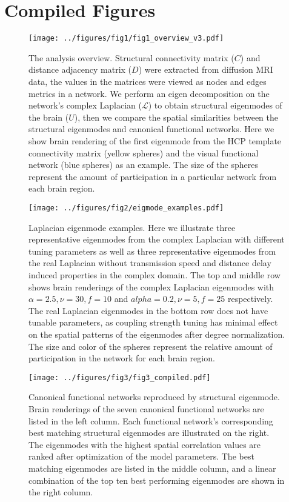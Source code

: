 \documentclass{article}
\begin{document}
\section{Compiled Figures}

\begin{figure}[ht]
  \centering
  \texttt{[image: ../figures/fig1/fig1\_overview\_v3.pdf]}
  \caption{The analysis overview. Structural connectivity matrix ($C$) and distance adjacency matrix ($D$) were extracted from diffusion MRI data, the values in the matrices were viewed as nodes and edges metrics in a network. We perform an eigen decomposition on the network's complex Laplacian ($\mathcal{L}$) to obtain structural eigenmodes of the brain ($U$), then we compare the spatial similarities between the structural eigenmodes and canonical functional networks. Here we show brain rendering of the first eigenmode from the HCP template connectivity matrix (yellow spheres) and the visual functional network (blue spheres) as an example. The size of the spheres represent the amount of participation in a particular network from each brain region.}
  \label{fig:fig1}
\end{figure}

\begin{figure}[ht]
 \centering
 \texttt{[image: ../figures/fig2/eigmode\_examples.pdf]}
 \caption{Laplacian eigenmode examples. Here we illustrate three representative eigenmodes from the complex Laplacian with different tuning parameters as well as three representative eigenmodes from the real Laplacian without transmission speed and distance delay induced properties in the complex domain. The top and middle row shows brain renderings of the complex Laplacian eigenmodes with {$\alpha = 2.5, \nu = 30, f = 10$} and {$alpha = 0.2, \nu = 5, f = 25$} respectively. The real Laplacian eigenmodes in the bottom row does not have tunable parameters, as coupling strength tuning has minimal effect on the spatial patterns of the eigenmodes after degree normalization. The size and color of the spheres represent the relative amount of participation in the network for each brain region.}
 \label{fig:fig2}
\end{figure}

\begin{figure}[ht]
 \centering
 \texttt{[image: ../figures/fig3/fig3\_compiled.pdf]}
 \caption{Canonical functional networks reproduced by structural eigenmode. Brain renderings of the seven canonical functional networks are listed in the left column. Each functional network's corresponding best matching structural eigenmodes are illustrated on the right. The eigenmodes with the highest spatial correlation values are ranked after optimization of the model parameters. The best matching eigenmodes are listed in the middle column, and a linear combination of the top ten best performing eigenmodes are shown in the right column.}
 \label{fig:fig3}
\end{figure}
\end{document}
